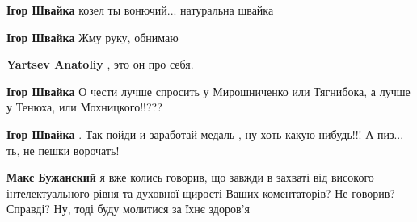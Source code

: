 \begin{itemize}
\begin{itemize}
 
\textbf{Ігор Швайка} козел ты вонючий... натуральна швайка

 
\textbf{Ігор Швайка} Жму руку, обнимаю

 
\textbf{Yartsev Anatoliy} , это он про себя. 🤣

 
\textbf{Ігор Швайка} О чести лучше спросить у Мирошниченко или Тягнибока, а лучше у Тенюха, или Мохницкого!!???

 
\textbf{Ігор Швайка} . Так пойди и заработай медаль , ну хоть какую нибудь!!! А пиз... ть, не пешки ворочать!

 

\textbf{Макс Бужанский} я вже колись говорив, що завжди в захваті від високого
інтелектуального рівня та духовної щирості Ваших коментаторів?  Не говорив?
Справді?  Ну, тоді буду молитися за їхнє здоров’я 🙏🙏🙏


\end{itemize}
\end{itemize}

